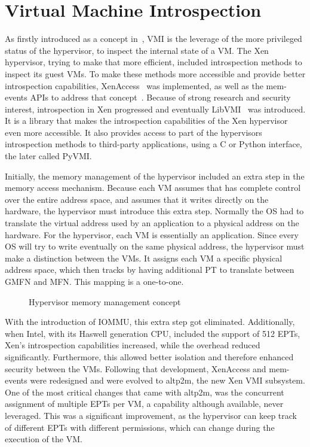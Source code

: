 \section{Virtual Machine Introspection}\label{sec:vmi}
As firstly introduced as a concept in~\cite{garfinkel2003virtual}, \ac{VMI} is the leverage of the more privileged status of the hypervisor, to inspect the internal state of a \ac{VM}. The Xen hypervisor, trying to make that more efficient, included introspection methods to inspect its guest \ac{VM}s. To make these methods more accessible and provide better introspection capabilities, XenAccess~\cite{payne2007secure} was implemented, as well as the mem-events \ac{API}s to address that concept~\cite{lars_2016}. Because of strong research and security interest, introspection in Xen progressed and eventually LibVMI~\cite{payne2011libvmi} was introduced. It is a library that makes the introspection capabilities of the Xen hypervisor even more accessible. It also provides access to part of the hypervisors introspection methods to third-party applications, using a C or Python interface, the later called PyVMI.

\par Initially, the memory management of the hypervisor included an extra step in the memory access mechanism. Because each \ac{VM} assumes that has complete control over the entire address space, and assumes that it writes directly on the hardware, the hypervisor must introduce this extra step. Normally the \ac{OS} had to translate the virtual address used by an application to a physical address on the hardware. For the hypervisor, each \ac{VM} is essentially an application. Since every \ac{OS} will try to write eventually on the same physical address, the hypervisor must make a distinction between the \ac{VM}s. It assigns each \ac{VM} a specific physical address space, which then tracks by having additional \ac{PT} to translate between \ac{GMFN} and \ac{MFN}. This mapping is a one-to-one.

\begin{figure}
	\centering
	
	\caption{Hypervisor memory management concept}
	\label{fig:hypmm}
\end{figure}

\par With the introduction of \ac{IOMMU}, this extra step got eliminated. Additionally, when Intel, with its Haswell generation \ac{CPU}, included the support of 512 \ac{EPT}s, Xen’s introspection capabilities increased, while the overhead reduced significantly. Furthermore, this allowed better isolation and therefore enhanced security between the \ac{VM}s. Following that development, XenAccess and mem-events were redesigned and were evolved to altp2m, the new Xen \ac{VMI} subsystem. One of the most critical changes that came with altp2m, was the concurrent assignment of multiple \ac{EPT}s per \ac{VM}, a capability although available, never leveraged. This was a significant improvement, as the hypervisor can keep track of different \ac{EPT}s with different permissions, which can change during the execution of the \ac{VM}.


